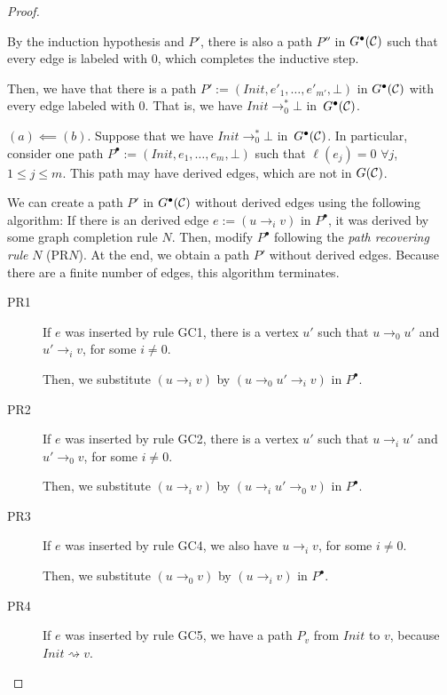 \begin{proof}
\begin{description}
\begin{description}
        By the induction hypothesis and $P'$, there is also a path $P''$ in $G^\bullet(\mathcal{C})$ such that every edge is labeled with 0, which completes the inductive step.
    \end{description}
    
    Then, we have that there is a path $P' := (Init, e'_1, \dots, e'_{m'}, \bot)$ in $G^\bullet(\mathcal{C})$ with every edge labeled with 0. That is, we have $Init \to_0^* \bot$ in~$G^\bullet(\mathcal{C})$.
    
    \item $(a) \impliedby (b)$. Suppose that we have $Init \to_0^* \bot$ in~$G^\bullet(\mathcal{C})$. In particular, consider one path $P^\bullet := (Init, e_1, \dots, e_m, \bot)$ such that $\ell(e_j) = 0$ $\forall j$, $1 \leq j \leq m$. This path may have derived edges, which are not in $G(\mathcal{C})$. 
    
    We can create a path $P'$ in $G^\bullet(\mathcal{C})$ without derived edges using the following algorithm: If there is an derived edge $e := (u \to_i v)$ in $P^\bullet$, it was derived by some graph completion rule $N$. Then, modify $P^\bullet$ following the \emph{path recovering rule} $N$ (PR$N$). At the end, we obtain a path $P'$ without derived edges. Because there are a finite number of edges, this algorithm terminates.
    
    \begin{description}
        \item[PR1] If $e$ was inserted by rule GC1, there is a vertex $u'$ such that $u \to_0 u'$ and $u' \to_i v$, for some $i \neq 0$. 
        
        Then, we substitute $(u \to_i v)$ by $(u \to_0 u' \to_i v)$ in $P^\bullet$.
        
        \item[PR2] If $e$ was inserted by rule GC2, there is a vertex $u'$ such that $u \to_i u'$ and $u' \to_0 v$, for some $i \neq 0$. 
        
        Then, we substitute $(u \to_i v)$ by $(u \to_i u' \to_0 v)$ in $P^\bullet$.
        
        \item[PR3] If $e$ was inserted by rule GC4, we also have $u \to_i v$, for some $i \neq 0$.
        
        Then, we substitute $(u \to_0 v)$ by $(u \to_i v)$ in $P^\bullet$.
        
        \item[PR4] If $e$ was inserted by rule GC5, we have a path $P_v$ from $Init$ to $v$, because $Init \rightsquigarrow v$.
        

\end{description}
\end{description}
\end{proof}
